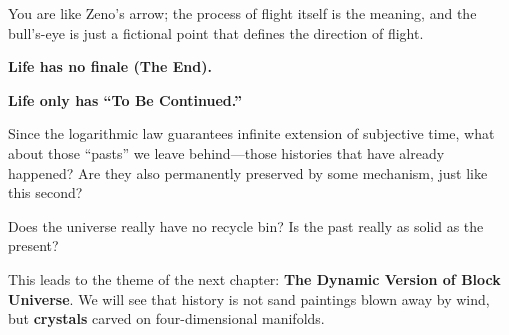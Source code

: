 You are like Zeno's arrow; the process of flight itself is the meaning, and the bull's-eye is just a fictional point that defines the direction of flight.

\textbf{Life has no finale (The End).}

\textbf{Life only has ``To Be Continued.''}

Since the logarithmic law guarantees infinite extension of subjective time, what about those ``pasts'' we leave behind---those histories that have already happened? Are they also permanently preserved by some mechanism, just like this second?

Does the universe really have no recycle bin? Is the past really as solid as the present?

This leads to the theme of the next chapter: \textbf{The Dynamic Version of Block Universe}. We will see that history is not sand paintings blown away by wind, but \textbf{crystals} carved on four-dimensional manifolds.


